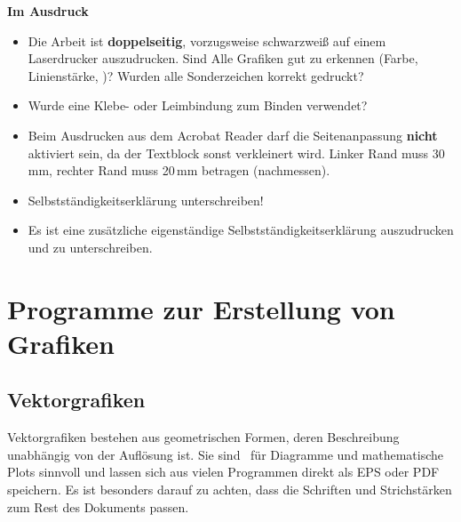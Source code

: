 \textbf{Im Ausdruck}
\begin{itemize}
	\item Die Arbeit ist \textbf{doppelseitig}, vorzugsweise schwarzweiß auf einem
	Laserdrucker auszudrucken. Sind Alle Grafiken gut zu erkennen (Farbe, Linienstärke, \etc)\vspace{.1em}?
	Wurden alle Sonderzeichen korrekt gedruckt\vspace{.1em}?
	\item Wurde eine Klebe- oder Leimbindung zum Binden verwendet?
	\item Beim Ausdrucken aus dem Acrobat Reader darf die Seitenanpassung
	\textbf{nicht} aktiviert sein, da der Textblock sonst verkleinert wird. Linker Rand muss 30\,mm,
	rechter Rand muss 20\,mm betragen (nachmessen).
	\item Selbstständigkeitserklärung unterschreiben!
	\item Es ist eine zusätzliche eigenständige Selbstständigkeitserklärung auszudrucken und zu unterschreiben.
\end{itemize}



\chapter{Programme zur Erstellung von Grafiken}
\label{cha:Anhang-Grafiken}

\section{Vektorgrafiken}

Vektorgrafiken bestehen aus geometrischen Formen, deren Beschreibung unabhängig
von der Auflösung ist. Sie sind \zB\ für Diagramme und mathematische Plots
sinnvoll und lassen sich aus vielen Programmen direkt als EPS oder PDF
speichern. Es ist besonders darauf zu achten, dass die Schriften und
Strichstärken zum Rest des Dokuments passen.

\renewcommand{\labelitemi}{$\bullet$}
	
